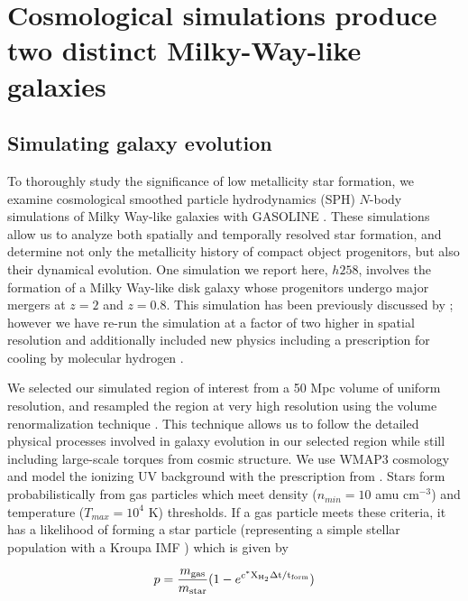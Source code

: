 \documentclass[nofootinbib,twocolumn,prd]{emulateapj}
\begin{document}
\section{Cosmological simulations produce two distinct Milky-Way-like galaxies}
\label{sec:sims}

\subsection{Simulating galaxy evolution}
To thoroughly study the significance of low metallicity star
formation, we examine cosmological smoothed particle hydrodynamics
(SPH) $N$-body simulations of Milky Way-like galaxies with GASOLINE
\citep{Stadel01,Wadsley04}.  These simulations allow us to analyze both
spatially and temporally resolved star formation, and determine not
only the metallicity history of compact object progenitors, but also
their dynamical evolution.  
One simulation we report here, $h258$,
involves the formation of a Milky Way-like disk galaxy whose
progenitors undergo major mergers at $z = 2$ and $z = 0.8$.  This
simulation has been previously discussed by
\citet{Governato09,Bellovary10,Bellovary11,Brooks11}; however we have
re-run the simulation at a factor of two higher in spatial resolution
and additionally included new physics including a prescription for
cooling by molecular hydrogen \citet{Christensen12}.

We selected our simulated region of interest from a 50 Mpc volume of
uniform resolution, and resampled the region at very high
resolution using the volume renormalization technique \citep{Katz93}.
This technique allows us to follow the detailed physical processes
involved in galaxy evolution in our selected region while still
including large-scale torques from cosmic structure.  We use
WMAP3 cosmology \citep{WMAP} and model the ionizing UV background
with the prescription from \citet{Haardt96}.  Stars form
probabilistically from gas particles which meet density ($n_{min} =
10$ amu cm$^{-3}$) and temperature ($T_{max} = 10^4$ K) thresholds. If a gas
particle meets these criteria, it has a likelihood of forming a star
particle (representing a simple stellar population with a Kroupa IMF
\citep{Kroupa01}) which is given by

\begin{equation}
p = \frac{m_{\rm gas}}{m_{\rm star}} (1 - e^{c^*\rm X_{\rm H_2} \Delta t/t_{\rm form}})
\end{equation}
\end{document}
